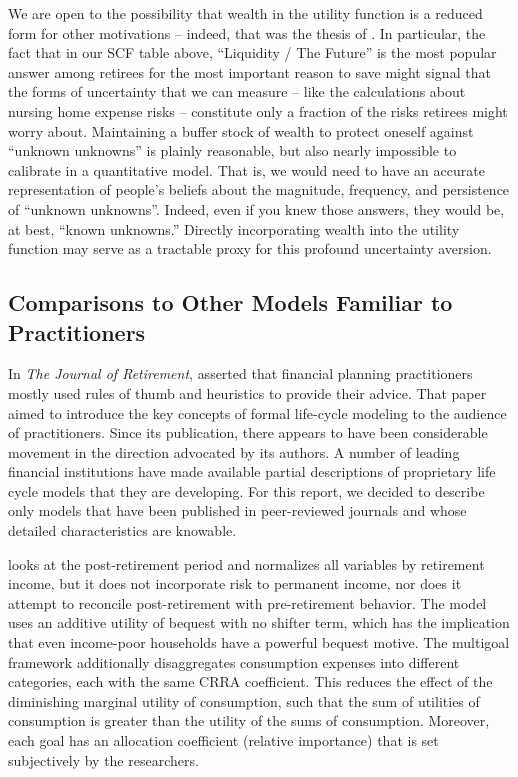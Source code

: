 \documentclass{article}
\begin{document}
We are open to the possibility that wealth in the utility function is a reduced form for other motivations -- indeed, that was the thesis of \cite{WhyDoTheRich}.
In particular, the fact that in our SCF table above, ``Liquidity / The Future'' is the most popular answer among retirees for the most important reason to save might signal that the forms of uncertainty that we can measure -- like the \cite{Ameriks2020jpe} calculations about nursing home expense risks -- constitute only a fraction of the risks retirees might worry about.
Maintaining a buffer stock of wealth to protect oneself against ``unknown unknowns'' is plainly reasonable, but also nearly impossible to calibrate in a quantitative model.
That is, we would need to have an accurate representation of people's beliefs about the magnitude, frequency, and persistence of ``unknown unknowns''.
Indeed, even if you knew those answers, they would be, at best, ``known unknowns.'' Directly incorporating wealth into the utility function may serve as a tractable proxy for this profound uncertainty aversion.

\subsection{Comparisons to Other Models Familiar to Practitioners}

In \textit{The Journal of Retirement}, \cite{Gordon_2014}  asserted that financial planning practitioners mostly used rules of thumb and heuristics to provide their advice.
That paper aimed to introduce the key concepts of formal life-cycle modeling to the audience of practitioners.
Since its publication, there appears to have been considerable movement in the direction advocated by its authors.
A number of leading financial institutions have made available partial descriptions of proprietary life cycle models that they are developing.
For this report, we decided to describe only models that have been published in peer-reviewed journals and whose detailed characteristics are knowable.

\cite{Daga_2023} looks at the post-retirement period and normalizes all variables by retirement income, but it does not incorporate risk to permanent income, nor does it attempt to reconcile post-retirement with pre-retirement behavior.
The model uses an additive utility of bequest with no shifter term, which has the implication that even income-poor households have a powerful bequest motive.
The multigoal framework additionally disaggregates consumption expenses into different categories, each with the same CRRA coefficient.
This reduces the effect of the diminishing marginal utility of consumption, such that the sum of utilities of consumption is greater than the utility of the sums of consumption.
Moreover, each goal has an allocation coefficient (relative importance) that is set subjectively by the researchers.
\end{document}
